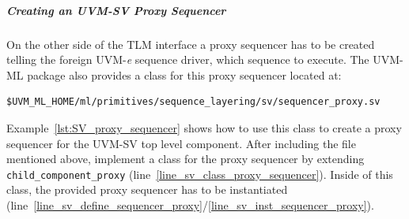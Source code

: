 \subparagraph{Creating an UVM-SV Proxy Sequencer}
On the other side of the TLM interface a proxy sequencer has to be created telling the foreign UVM-\textit{e} sequence driver, which sequence to execute. The UVM-ML package also provides a class for this proxy sequencer located at:
\smallskip
{}
\begin{lstlisting}
$UVM_ML_HOME/ml/primitives/sequence_layering/sv/sequencer_proxy.sv
\end{lstlisting} 
\smallskip
Example~\ref{lst:SV_proxy_sequencer} shows how to use this class to create a proxy sequencer for the UVM-SV top level component. After including the file mentioned above, implement a class for the proxy sequencer by extending \lstinline$child_component_proxy$ (line~\ref{line_sv_class_proxy_sequencer}). Inside of this class, the provided proxy sequencer has to be instantiated (line~\ref{line_sv_define_sequencer_proxy}/\ref{line_sv_inst_sequencer_proxy}).\\

